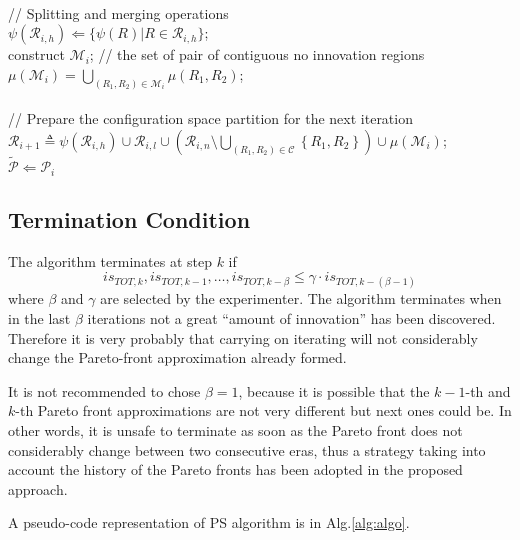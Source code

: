 \begin{algorithm}[t]
{			\nl \\ // Splitting and merging operations\\
			\nl $\psi(\mathscr{R}_{i,h}) \Leftarrow \lbrace 
					\psi(R) | R\in \mathscr{R}_{i,h}	
				\rbrace$; \\
			\nl construct $\mathscr{M}_i$; // the set of pair of contiguous no innovation regions \\
			\nl $\mu(\mathscr{M}_i) = \bigcup_{(R_1,R_2)\in\mathscr{M}_i} \mu(R_1,R_2)$;\\
			\nl\\ // Prepare the configuration space partition for the next iteration \\
			\nl $\mathcal{R}_{i+1} \triangleq
	\psi\left(\mathscr{R}_{i,h}\right) \cup \mathcal{R}_{i,l}\cup
	\left(\mathcal{R}_{i,n}\setminus\bigcup_{\left(R_{1},R_{2}\right)\in\mathcal{C}}\left\{ R_{1},R_{2}\right\} \right)\cup \mu(\mathscr{M}_i)$;\\
		}
	\nl $\tilde{\mathscr{P}} \Leftarrow \mathscr{P}_i$
\end{algorithm}

\subsection{Termination Condition}
The algorithm terminates at step $k$ if
\[
is_{TOT,k},is_{TOT,k-1},\dots,is_{TOT,k-\beta}\le\gamma\cdot is_{TOT,k-\left(\beta-1\right)}
\]
 where $\beta$ and $\gamma$ are selected by the experimenter. 
The algorithm terminates when in the last
$\beta$ iterations not a great ``amount of innovation'' has been
discovered. Therefore it is very probably that carrying on iterating
will not considerably change the Pareto-front approximation already formed. 

It is not recommended to chose $\beta=1$, because it is possible that the
$k-1$-th and $k$-th Pareto front approximations are not very different but next ones could be. In other words,
it is unsafe to terminate as soon as the Pareto front does not considerably change
between two consecutive eras, thus a strategy taking into
account the history of the Pareto fronts has been adopted in the
proposed approach.

A pseudo-code representation of PS algorithm is in Alg.\ref{alg:algo}.

